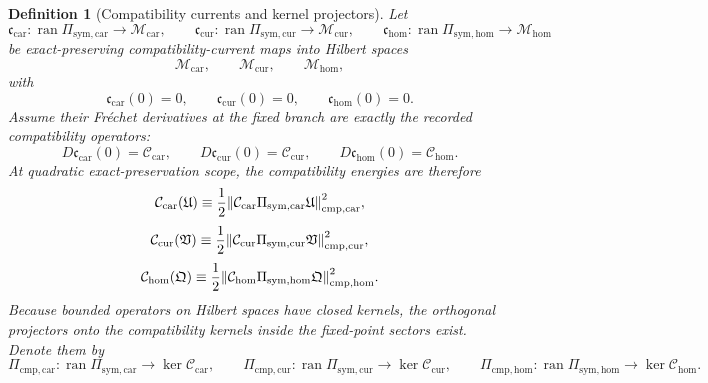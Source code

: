 \documentclass[11pt]{article}
\newcommand{\RootTensor}{\mathfrak U}
\newcommand{\RootRelabel}{\mathfrak V}
\newcommand{\RootFree}{\mathfrak Q}
\newcommand{\TensorSymProj}{\Pi_{\mathrm{sym,car}}}
\newcommand{\CurSymProj}{\Pi_{\mathrm{sym,cur}}}
\newcommand{\HomSymProj}{\Pi_{\mathrm{sym,hom}}}
\newcommand{\TensorCompat}{\mathcal C_{\mathrm{car}}}
\newcommand{\CurCompat}{\mathcal C_{\mathrm{cur}}}
\newcommand{\HomCompat}{\mathcal C_{\mathrm{hom}}}
\newcommand{\TensorCmpProj}{\Pi_{\mathrm{cmp,car}}}
\newcommand{\CurCmpProj}{\Pi_{\mathrm{cmp,cur}}}
\newcommand{\HomCmpProj}{\Pi_{\mathrm{cmp,hom}}}
\newtheorem{definition}{Definition}
\begin{document}
\begin{definition}[Compatibility currents and kernel projectors]
\label{def:compat_currents}
Let
\[
\mathfrak c_{\mathrm{car}}:\operatorname{ran}\TensorSymProj\to \mathscr M_{\mathrm{car}},\qquad
\mathfrak c_{\mathrm{cur}}:\operatorname{ran}\CurSymProj\to \mathscr M_{\mathrm{cur}},\qquad
\mathfrak c_{\mathrm{hom}}:\operatorname{ran}\HomSymProj\to \mathscr M_{\mathrm{hom}}
\]
be exact-preserving compatibility-current maps into Hilbert spaces
\[
\mathscr M_{\mathrm{car}},\qquad
\mathscr M_{\mathrm{cur}},\qquad
\mathscr M_{\mathrm{hom}},
\]
with
\[
\mathfrak c_{\mathrm{car}}(0)=0,\qquad
\mathfrak c_{\mathrm{cur}}(0)=0,\qquad
\mathfrak c_{\mathrm{hom}}(0)=0.
\]
Assume their Fr\'echet derivatives at the fixed branch are exactly the recorded compatibility operators:
\begin{equation}
D\mathfrak c_{\mathrm{car}}(0)=\TensorCompat,\qquad
D\mathfrak c_{\mathrm{cur}}(0)=\CurCompat,\qquad
D\mathfrak c_{\mathrm{hom}}(0)=\HomCompat.
\label{eq:compat_linearizations}
\end{equation}
At quadratic exact-preservation scope, the compatibility energies are therefore
\begin{equation}
\mathcal C_{\mathrm{car}}(\RootTensor)
\equiv
\frac12\norm{\TensorCompat\TensorSymProj\RootTensor}_{\mathrm{cmp,car}}^2,
\label{eq:ccar}
\end{equation}
\begin{equation}
\mathcal C_{\mathrm{cur}}(\RootRelabel)
\equiv
\frac12\norm{\CurCompat\CurSymProj\RootRelabel}_{\mathrm{cmp,cur}}^2,
\label{eq:ccur}
\end{equation}
\begin{equation}
\mathcal C_{\mathrm{hom}}(\RootFree)
\equiv
\frac12\norm{\HomCompat\HomSymProj\RootFree}_{\mathrm{cmp,hom}}^2.
\label{eq:chom}
\end{equation}
Because bounded operators on Hilbert spaces have closed kernels, the orthogonal projectors onto the compatibility kernels inside the fixed-point sectors exist. Denote them by
\[
\TensorCmpProj:\operatorname{ran}\TensorSymProj\to\ker\TensorCompat,\qquad
\CurCmpProj:\operatorname{ran}\CurSymProj\to\ker\CurCompat,\qquad
\HomCmpProj:\operatorname{ran}\HomSymProj\to\ker\HomCompat.
\]
\end{definition}
\end{document}
